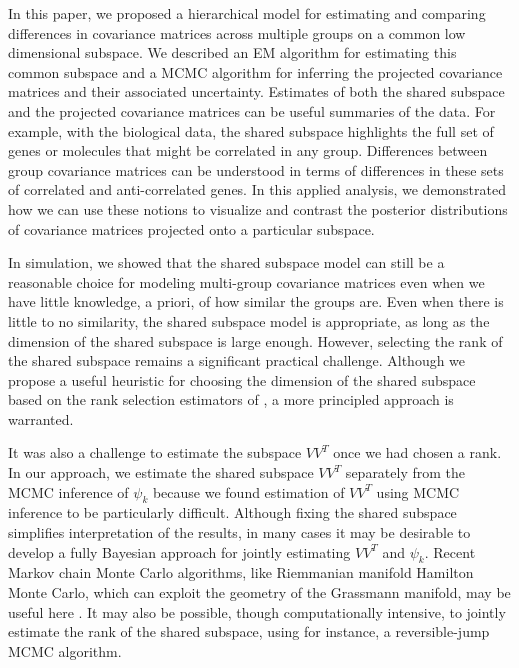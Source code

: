 \documentclass{article}
\begin{document}
In this paper, we proposed a hierarchical model for estimating and
comparing differences in covariance matrices across multiple groups on
a common low dimensional subspace.  We described an EM algorithm for
estimating this common subspace and a MCMC algorithm for inferring the
projected covariance matrices and their associated uncertainty.
Estimates of both the shared subspace and the projected covariance
matrices can be useful summaries of the data.  For example, with the
biological data, the shared subspace highlights the full set of genes
or molecules that might be correlated in any group.  Differences between
group covariance matrices can be understood in terms of differences in
these sets of correlated and anti-correlated genes.  In this applied
analysis, we demonstrated how we can use these notions to visualize
and contrast the posterior distributions of covariance matrices
projected onto a particular subspace.

In simulation, we showed that the shared subspace model can
still be a reasonable choice for modeling multi-group covariance
matrices even when we have little knowledge, a priori, of how similar
the groups are.  Even when there is little to no similarity, the shared
subspace model is appropriate, as long as the dimension of the shared
subspace is large enough.  However, selecting the rank of the shared
subspace remains a significant practical challenge.  Although we
propose a useful heuristic for choosing the dimension of the shared
subspace based on the rank selection estimators of \citet{Gavish2014},
a more principled approach is warranted.  

It was also a challenge to estimate the subspace $VV^T$ once we had
chosen a rank.  In our approach, we estimate the shared subspace
$VV^T$ separately from the MCMC inference of $\psi_k$ because we found
estimation of $VV^T$ using MCMC inference to be
particularly difficult.  Although fixing the shared subspace
simplifies interpretation of the results, in many cases it may be
desirable to develop a fully Bayesian approach for jointly estimating
$VV^T$ and $\psi_k$.  Recent Markov chain Monte Carlo algorithms, like
Riemmanian manifold Hamilton Monte Carlo, which can exploit the
geometry of the Grassmann manifold, may be useful here \citep{Byrne2013,
  Girolami2011}.  It may also be possible, though computationally
intensive, to jointly estimate the rank of the shared subspace, using
for instance, a reversible-jump MCMC algorithm.
\end{document}
